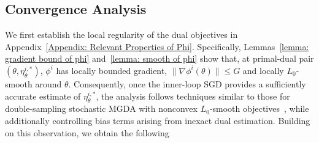 \documentclass[twoside]{article} %
\def\eqref#1{equation~\ref{#1}}
\theoremstyle{plain}
\theoremstyle{definition}
\theoremstyle{remark}
\newcommand{\fL}{\mathcal{L}}
\begin{document}
\subsection{Convergence Analysis}
We first establish the local regularity of the dual objectives in
Appendix~\ref{Appendix: Relevant Properties of Phi}. Specifically,
Lemmas~\ref{lemma: gradient bound of phi} and~\ref{lemma: smooth of phi} show
that, at primal-dual pair $(\theta,\eta_{\theta}^{i,*})$, $\phi^i$ has locally bounded gradient,
$\|\nabla\phi^i(\theta)\|\leq G$ and locally $L_0$-smooth around
$\theta$.
Consequently, once the inner-loop SGD provides a sufficiently accurate estimate of $\eta_{\theta}^{i,*}$, the analysis follows techniques similar to those for double-sampling stochastic MGDA with nonconvex $L_0$-smooth objectives~\citep{qimgda}, while additionally controlling bias terms arising from inexact dual estimation. Building on this observation, we obtain the following
\end{document}
